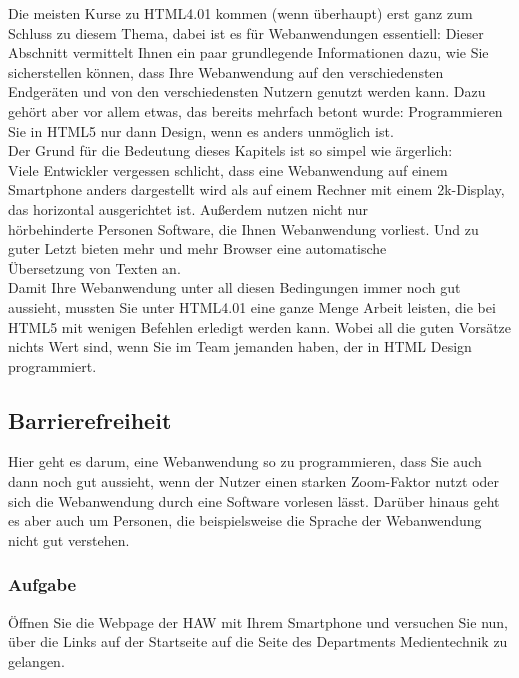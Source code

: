 Die meisten Kurse zu HTML4.01 kommen (wenn überhaupt) erst ganz zum Schluss zu diesem Thema, dabei ist es für Webanwendungen essentiell: Dieser Abschnitt vermittelt Ihnen ein paar grundlegende Informationen dazu, wie Sie sicherstellen können, dass Ihre Webanwendung auf den verschiedensten Endgeräten und von den verschiedensten Nutzern genutzt werden kann. Dazu gehört aber vor allem etwas, das bereits mehrfach betont wurde: Programmieren Sie in HTML5 nur dann Design, wenn es anders unmöglich ist.\\

Der Grund für die Bedeutung dieses Kapitels ist so simpel wie ärgerlich:\\

Viele Entwickler vergessen schlicht, dass eine Webanwendung auf einem Smartphone anders dargestellt wird als auf einem Rechner mit einem 2k-Display, das horizontal ausgerichtet ist. Außerdem nutzen nicht nur \\hörbehinderte Personen Software, die Ihnen Webanwendung vorliest. Und zu guter Letzt bieten mehr und mehr Browser eine automatische \\Übersetzung von Texten an.\\

Damit Ihre Webanwendung unter all diesen Bedingungen immer noch gut aussieht, mussten Sie unter HTML4.01 eine ganze Menge Arbeit leisten, die bei HTML5 mit wenigen Befehlen erledigt werden kann. Wobei all die guten Vorsätze nichts Wert sind, wenn Sie im Team jemanden haben, der in HTML Design programmiert.

\subsection{Barrierefreiheit}

Hier geht es darum, eine Webanwendung so zu programmieren, dass Sie auch dann noch gut aussieht, wenn der Nutzer einen starken Zoom-Faktor nutzt oder sich die Webanwendung durch eine Software vorlesen lässt. Darüber hinaus geht es aber auch um Personen, die beispielsweise die Sprache der Webanwendung nicht gut verstehen.

\subsubsection{Aufgabe}

Öffnen Sie die Webpage der HAW mit Ihrem Smartphone und versuchen Sie nun, über die Links auf der Startseite auf die Seite des Departments Medientechnik zu gelangen.\\

